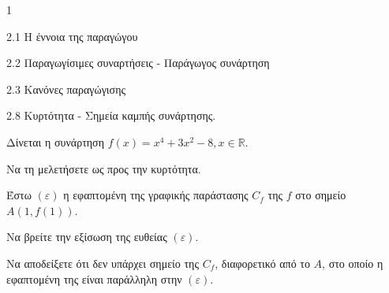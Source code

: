 \begin{ylh}{1}
    \item 2.1 Η έννοια της παραγώγου
    \item 2.2 Παραγωγίσιμες συναρτήσεις - Παράγωγος συνάρτηση
    \item 2.3 Κανόνες παραγώγισης
    \item 2.8 Κυρτότητα - Σημεία καμπής συνάρτησης.
\end{ylh}
Δίνεται η συνάρτηση $f(x) = x^4 + 3x^2 - 8, x \in \mathbb{R}$.
\begin{alist}
\item Να τη μελετήσετε ως προς την κυρτότητα. 
\item Έστω $(\varepsilon)$ η εφαπτομένη της γραφικής παράστασης $C_f$ της $f$ στο σημείο $A(1, f(1))$.
    \begin{rlist}
    \item Να βρείτε την εξίσωση της ευθείας $(\varepsilon)$. 
    \item Να αποδείξετε ότι δεν υπάρχει σημείο της $C_f$, διαφορετικό από το $A$, στο οποίο η εφαπτομένη της είναι παράλληλη στην $(\varepsilon)$. 
    \end{rlist}
\end{alist}